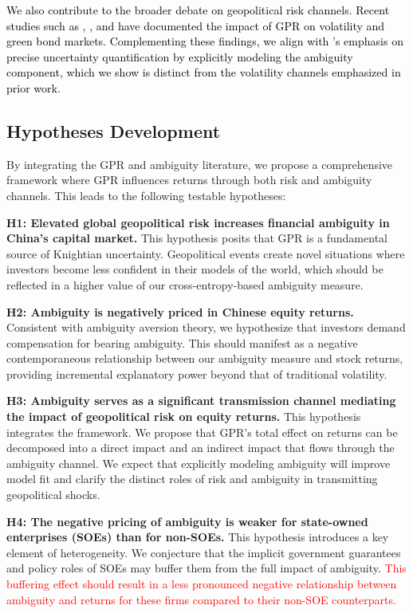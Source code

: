 \documentclass[preprint,12pt,authoryear]{elsarticle}
\begin{document}
\textcolor{black}{We also contribute to the broader debate on geopolitical risk channels. Recent studies such as \citet{Bouri2024}, \citet{Liu2024}, and \citet{Zhang2023} have documented the impact of GPR on volatility and green bond markets. Complementing these findings, we align with \citet{Nemani2023}’s emphasis on precise uncertainty quantification by explicitly modeling the ambiguity component, which we show is distinct from the volatility channels emphasized in prior work.}

\subsection{Hypotheses Development}

By integrating the GPR and ambiguity literature, we propose a comprehensive framework where GPR influences returns through both risk and ambiguity channels. This leads to the following testable hypotheses:

\textbf{H1: Elevated global geopolitical risk increases financial ambiguity in China's capital market.}
This hypothesis posits that GPR is a fundamental source of Knightian uncertainty. Geopolitical events create novel situations where investors become less confident in their models of the world, which should be reflected in a higher value of our cross-entropy-based ambiguity measure.

\textbf{H2: Ambiguity is negatively priced in Chinese equity returns.}
Consistent with ambiguity aversion theory, we hypothesize that investors demand compensation for bearing ambiguity. This should manifest as a negative contemporaneous relationship between our ambiguity measure and stock returns, providing incremental explanatory power beyond that of traditional volatility.

\textbf{H3: Ambiguity serves as a significant transmission channel mediating the impact of geopolitical risk on equity returns.}
This hypothesis integrates the framework. We propose that GPR's total effect on returns can be decomposed into a direct impact and an indirect impact that flows through the ambiguity channel. We expect that explicitly modeling ambiguity will improve model fit and clarify the distinct roles of risk and ambiguity in transmitting geopolitical shocks.

\textbf{H4: The negative pricing of ambiguity is weaker for state-owned enterprises (SOEs) than for non-SOEs.}
This hypothesis introduces a key element of heterogeneity. We conjecture that the implicit government guarantees and policy roles of SOEs may buffer them from the full impact of ambiguity. \textcolor{red}{This buffering effect should result in a less pronounced negative relationship between ambiguity and returns for these firms compared to their non-SOE counterparts.}
\end{document}
